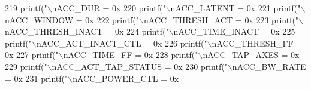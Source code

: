 \begin{DoxyCode}
{{{{{219   printf(\textcolor{stringliteral}{"\(\backslash\)nACC\_DUR = 0x%
220   printf(\textcolor{stringliteral}{"\(\backslash\)nACC\_LATENT = 0x%
221   printf(\textcolor{stringliteral}{"\(\backslash\)nACC\_WINDOW = 0x%
222   printf(\textcolor{stringliteral}{"\(\backslash\)nACC\_THRESH\_ACT = 0x%
223   printf(\textcolor{stringliteral}{"\(\backslash\)nACC\_THRESH\_INACT = 0x%
224   printf(\textcolor{stringliteral}{"\(\backslash\)nACC\_TIME\_INACT = 0x%
225   printf(\textcolor{stringliteral}{"\(\backslash\)nACC\_ACT\_INACT\_CTL = 0x%
226   printf(\textcolor{stringliteral}{"\(\backslash\)nACC\_THRESH\_FF = 0x%
227   printf(\textcolor{stringliteral}{"\(\backslash\)nACC\_TIME\_FF = 0x%
228   printf(\textcolor{stringliteral}{"\(\backslash\)nACC\_TAP\_AXES = 0x%
229   printf(\textcolor{stringliteral}{"\(\backslash\)nACC\_ACT\_TAP\_STATUS = 0x%
230   printf(\textcolor{stringliteral}{"\(\backslash\)nACC\_BW\_RATE = 0x%
231   printf(\textcolor{stringliteral}{"\(\backslash\)nACC\_POWER\_CTL = 0x%
}}}}}}}}}}}}}}}}}}
\end{DoxyCode}
